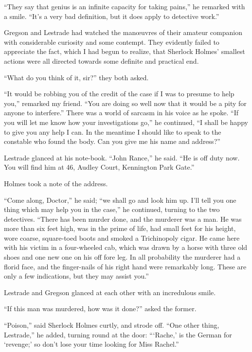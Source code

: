 \documentclass[12pt,english]{book}
\begin{document}
{}``They say that genius is an infinite capacity for taking pains,''
he remarked with a smile. {}``It's a very bad definition, but it
does apply to detective work.''

Gregson and Lestrade had watched the man\oe uvres of their amateur
companion with considerable curiosity and some contempt. They evidently
failed to appreciate the fact, which I had begun to realize, that
Sherlock Holmes' smallest actions were all directed towards some definite
and practical end.

{}``What do you think of it, sir?'' they both asked.

{}``It would be robbing you of the credit of the case if I was to
presume to help you,'' remarked my friend. {}``You are doing so
well now that it would be a pity for anyone to interfere.'' There
was a world of sarcasm in his voice as he spoke. {}``If you will
let me know how your investigations go,'' he continued, {}``I shall
be happy to give you any help I can. In the meantime I should like
to speak to the constable who found the body. Can you give me his
name and address?''

Lestrade glanced at his note-book. {}``John Rance,'' he said. {}``He
is off duty now. You will find him at 46, Audley Court, Kennington
Park Gate.''

Holmes took a note of the address.

{}``Come along, Doctor,'' he said; {}``we shall go and look him
up. I'll tell you one thing which may help you in the case,'' he
continued, turning to the two detectives. {}``There has been murder
done, and the murderer was a man. He was more than six feet high,
was in the prime of life, had small feet for his height, wore coarse,
square-toed boots and smoked a Trichinopoly cigar. He came here with
his victim in a four-wheeled cab, which was drawn by a horse with
three old shoes and one new one on his off fore leg. In all probability
the murderer had a florid face, and the finger-nails of his right
hand were remarkably long. These are only a few indications, but they
may assist you.''

Lestrade and Gregson glanced at each other with an incredulous smile.

{}``If this man was murdered, how was it done?'' asked the former.

{}``Poison,'' said Sherlock Holmes curtly, and strode off. {}``One
other thing, Lestrade,'' he added, turning round at the door: {}```Rache,'
is the German for `revenge;' so don't lose your time looking for Miss
Rachel.''
\end{document}
